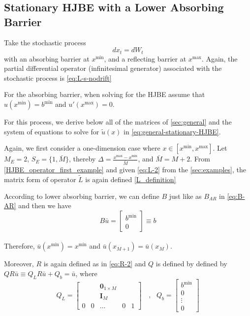 \documentclass[11pt]{article}
\begin{document}
\subsection{Stationary HJBE with a Lower Absorbing Barrier}
Take the stochastic process
$$
d x_t = d W_t
$$
with an absorbing barrier at $x^{\min}$, and a reflecting barrier at $x^{\max}$. Again, the partial differential operator (infinitesimal generator) associated with the stochastic process is \cref{eq:L-s-nodrift}

For the absorbing barrier, when solving for the HJBE assume that $u(x^{\min}) = b^{\min}$ and $u'(x^{\max}) = 0$.

For this process, we derive below all of the matrices of \cref{sec:general} and the system of equations to solve for $\tilde{u}(x)$ in \cref{eq:general-stationary-HJBE}.

Again, we first consider a one-dimension case where $x\in [x^{\min},x^{\max}]$. Let $M_E = 2$, $S_E = \{1,\bar{M}\}$, thereby $\Delta  = \frac{x^{\max}-x^{\min}}{\bar{M}}$, and $\bar{M} = M+2$. From \cref{HJBE_operator_first_example} and given \cref{eq:L-2} from the \cref{sec:examples}, the matrix form of operator $\tilde{L}$ is again defined \cref{L_definition}

According to lower absorbing barrier, we can define $B$ just like as $B_{AR}$ in \cref{eq:B-AR} and then we have
\begin{equation}
B\bar{u} = \begin{bmatrix}
b^{\min}\\
0
\end{bmatrix} \equiv b
\end{equation}\\
Therefore, $\bar{u}(x^{\min}) = x^{\min}$ and $\bar{u}(x_{M+1}) = \bar{u}(x_M)$.

Moreover, $R$ is again defined as in \cref{eq:R-2} and $Q$ is defined by defined by $Q R\bar{u}\equiv Q_L R\bar{u}+Q_b = \bar{u}$, where
\begin{equation}
Q_L = \begin{bmatrix}
& & \mathbf{0}_{1\times M} & & \\
& & \mathbf{I}_M & & \\
0&0&\dots&0&1
\end{bmatrix}%
\quad, \text{ } Q_b = \begin{bmatrix}
b^{\min}\\
0\\
\vdots\\
0
\end{bmatrix}%
\end{equation}
\end{document}
